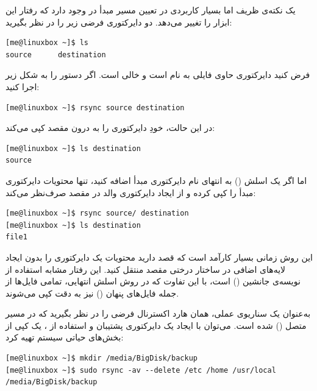 یک نکته‌ی ظریف اما بسیار کاربردی در تعیین مسیر مبدأ در  وجود دارد که رفتار این ابزار را تغییر می‌دهد. دو دایرکتوری فرضی زیر را در نظر بگیرید:

\begin{latin}
\begin{lstlisting}
[me@linuxbox ~]$ ls
source      destination
\end{lstlisting}
\end{latin}

فرض کنید دایرکتوری  حاوی فایلی به نام  است و  خالی است. اگر دستور را به شکل زیر اجرا کنید:

\begin{latin}
\begin{lstlisting}
[me@linuxbox ~]$ rsync source destination
\end{lstlisting}
\end{latin}

در این حالت،  خودِ دایرکتوری  را به درون مقصد کپی می‌کند:

\begin{latin}
\begin{lstlisting}
[me@linuxbox ~]$ ls destination
source
\end{lstlisting}
\end{latin}

اما اگر یک اسلش (\cmd{/}) به انتهای نام دایرکتوری مبدأ اضافه کنید،  تنها محتویات دایرکتوری مبدأ را کپی کرده و از ایجاد دایرکتوری والد در مقصد صرف‌نظر می‌کند:

\begin{latin}
\begin{lstlisting}
[me@linuxbox ~]$ rsync source/ destination
[me@linuxbox ~]$ ls destination
file1
\end{lstlisting}
\end{latin}

این روش زمانی بسیار کارآمد است که قصد دارید محتویات یک دایرکتوری را بدون ایجاد لایه‌های اضافی در ساختار درختی مقصد منتقل کنید. این رفتار مشابه استفاده از نویسه‌ی جانشین () است، با این تفاوت که در روش اسلش انتهایی، تمامی فایل‌ها از جمله فایل‌های پنهان () نیز به دقت کپی می‌شوند.

به‌عنوان یک سناریوی عملی، همان هارد اکسترنال فرضی را در نظر بگیرید که در مسیر  متصل () شده است. می‌توان با ایجاد یک دایرکتوری پشتیبان و استفاده از ، یک کپی از بخش‌های حیاتی سیستم تهیه کرد:

\begin{latin}
\begin{lstlisting}
[me@linuxbox ~]$ mkdir /media/BigDisk/backup
[me@linuxbox ~]$ sudo rsync -av --delete /etc /home /usr/local /media/BigDisk/backup
\end{lstlisting}
\end{latin}

